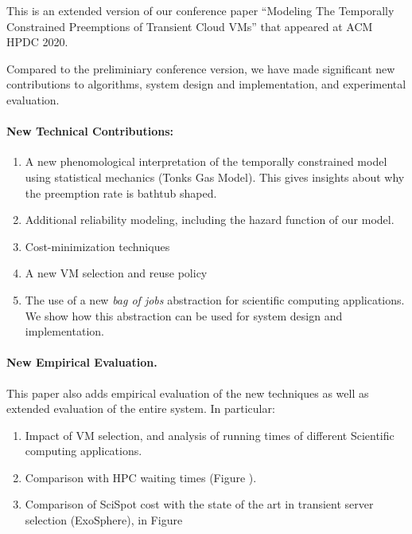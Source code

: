 \documentclass{article}
\begin{document}
This is an extended version of our conference paper ``Modeling The Temporally Constrained Preemptions of Transient Cloud VMs'' that appeared at ACM HPDC 2020. 

Compared to the preliminiary conference version, we have made significant new contributions to algorithms, system design and implementation, and experimental evaluation. 

\paragraph{New Technical Contributions:}

\begin{enumerate}
\item A new phenomological interpretation of the temporally constrained model using statistical mechanics (Tonks Gas Model). This gives insights about why the preemption rate is bathtub shaped. 

\item Additional reliability modeling, including the hazard function of our model. 

\item Cost-minimization techniques 

\item A new VM selection and reuse policy 

\item The use of a new \emph{bag of jobs} abstraction for scientific computing applications. We show how this abstraction can be used for system design and implementation.

\end{enumerate}

\paragraph{New Empirical Evaluation.}
This paper also adds empirical evaluation of the new techniques as well as extended evaluation of the entire system. In particular:

\begin{enumerate}
\item Impact of VM selection, and analysis of running times of different Scientific computing applications. 
\item Comparison with HPC waiting times (Figure ). 
\item Comparison of SciSpot cost with the state of the art in transient server selection (ExoSphere), in Figure 
\end{enumerate}
\end{document}
